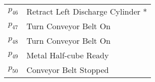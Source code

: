 \begin{table}[H]
\begin{tabular}{M{5cm}M{10cm}}
\hyperlink{partialNet:p46}{\hypertarget{partialTable:p46}{$p_{46}$}} & Retract Left Discharge Cylinder *\\
\hyperlink{partialNet:p47}{\hypertarget{partialTable:p47}{$p_{47}$}} & Turn Conveyor Belt On\\
\hyperlink{partialNet:p48}{\hypertarget{partialTable:p48}{$p_{48}$}} & Turn Conveyor Belt On\\
\hyperlink{partialNet:p49}{\hypertarget{partialTable:p49}{$p_{49}$}} & Metal Half-cube Ready\\
\hyperlink{partialNet:p50}{\hypertarget{partialTable:p50}{$p_{50}$}} & Conveyor Belt Stopped\\
\end{tabular}
\end{table}
